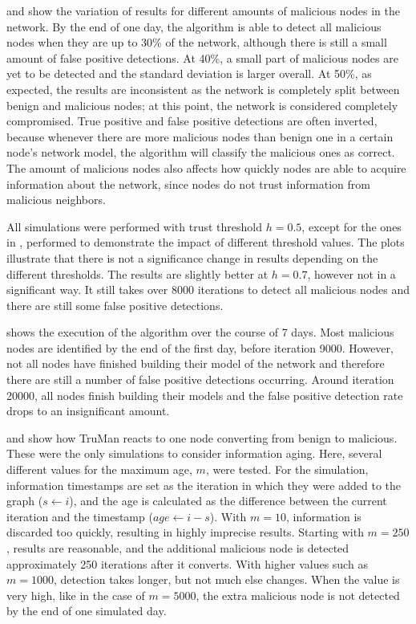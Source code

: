 
 and  show the variation of results for different amounts of malicious nodes in the network.
By the end of one day, the algorithm is able to detect all malicious nodes when they are up to 30\% of the network, although there is still a small amount of false positive detections.
At 40\%, a small part of malicious nodes are yet to be detected and the standard deviation is larger overall.
At 50\%, as expected, the results are inconsistent as the network is completely split between benign and malicious nodes; at this point, the network is considered completely compromised.
True positive and false positive detections are often inverted, because whenever there are more malicious nodes than benign one in a certain node's network model, the algorithm will classify the malicious ones as correct.
The amount of malicious nodes also affects how quickly nodes are able to acquire information about the network, since nodes do not trust information from malicious neighbors.

All simulations were performed with trust threshold $h=0.5$, except for the ones in , performed to demonstrate the impact of different threshold values.
The plots illustrate that there is not a significance change in results depending on the different thresholds.
The results are slightly better at $h=0.7$, however not in a significant way.
It still takes over 8000 iterations to detect all malicious nodes and there are still some false positive detections.

 shows the execution of the algorithm over the course of 7 days.
Most malicious nodes are identified by the end of the first day, before iteration 9000.
However, not all nodes have finished building their model of the network and therefore there are still a number of false positive detections occurring.
Around iteration 20000, all nodes finish building their models and the false positive detection rate drops to an insignificant amount.

 and  show how TruMan reacts to one node converting from benign to malicious.
These were the only simulations to consider information aging.
Here, several different values for the maximum age, $m$, were tested.
For the simulation, information timestamps are set as the iteration in which they were added to the graph ($s \gets i$), and the age is calculated as the difference between the current iteration and the timestamp ($age \gets i - s$).
With $m=10$, information is discarded too quickly, resulting in highly imprecise results.
Starting with $m=250$, results are reasonable, and the additional malicious node is detected approximately 250 iterations after it converts.
With higher values such as $m=1000$, detection takes longer, but not much else changes. 
When the value is very high, like in the case of $m=5000$, the extra malicious node is not detected by the end of one simulated day.



